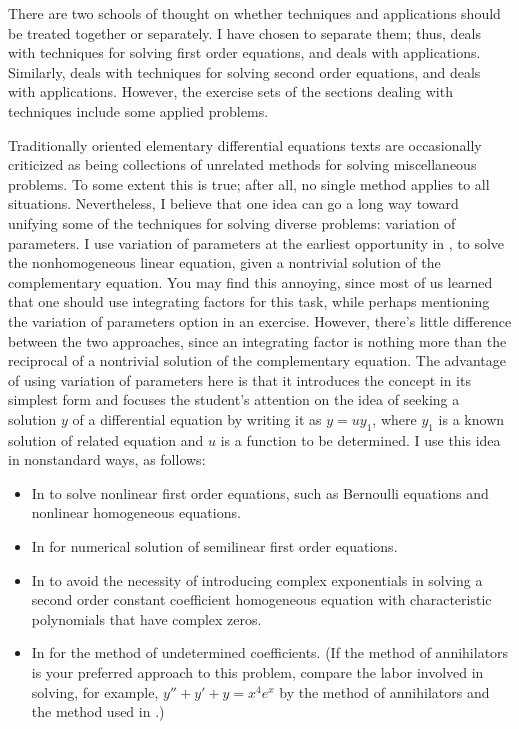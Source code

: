 There are two schools of thought on whether techniques and
applications should be treated together or separately. I have chosen
to separate them;
thus,  deals with techniques for solving
first order equations, and  deals with applications.
Similarly,
 deals with techniques for solving second order
equations, and  deals with applications. However, the
exercise sets of the sections dealing with techniques  include some
applied problems.

Traditionally oriented elementary differential
equations texts are occasionally  criticized as being collections of
unrelated methods for solving miscellaneous problems. To some extent
this is true;     after all, no single method  applies to all
situations. Nevertheless, I believe that one idea can go a long way
toward unifying some of the techniques for solving diverse problems:
variation of parameters. I use variation of parameters at the earliest
opportunity in ,
to solve the nonhomogeneous linear equation,
given a nontrivial solution of the complementary equation.
You may find this annoying, since most of us learned that one should
use integrating factors for this task, while perhaps mentioning the
variation of parameters option in an exercise. However, there's
little difference between the two approaches, since an integrating
factor is nothing more than the reciprocal of a nontrivial solution of
the complementary equation. The advantage of using variation of
parameters here is that it introduces the concept in its simplest form
and focuses the student's attention on the idea of seeking a solution
$y$ of a differential equation by writing it as $y=uy_1$, where $y_1$
is a known solution of related equation and $u$ is a function to be
determined. I use this idea in nonstandard ways, as follows:

\begin{itemize}
\item
In  to solve nonlinear first order equations,
such as Bernoulli equations and nonlinear homogeneous equations.

\item  In   for  numerical solution of
semilinear  first order equations.

\item In  to avoid the necessity of introducing
complex
exponentials in solving a second order constant coefficient
homogeneous equation with characteristic polynomials  that have complex
zeros.

\item In 
for the method of undetermined
coefficients. (If the method of annihilators is your preferred
approach to this problem, compare the labor involved in solving, for
example, $y''+y'+y=x^4e^x$ by the method of annihilators and the
method used in .)
\end{itemize}

